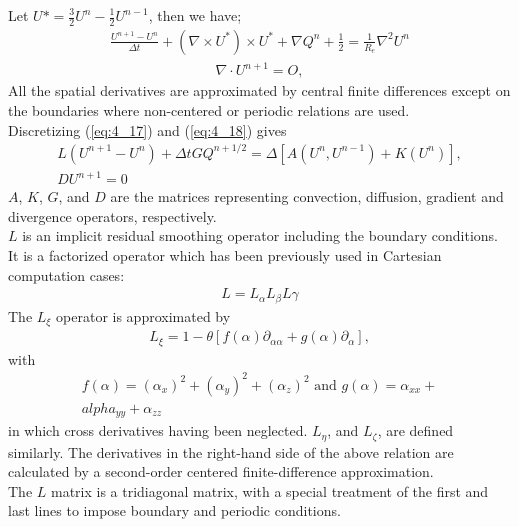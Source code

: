 \documentclass[11pt]{report}
\newcommand{\sps}{\\[0.2cm]}
\newcommand{\refn}[1]{(\ref{#1})}
\newcommand{\refx}[1]{\refn{eq:#1}}
\newcommand{\dsp}{\displaystyle}
\newcommand{\NI}{\noindent}
\begin{document}
	\NI Let $U*=\dsp\frac{3}{2}U^n - \frac{1}{2}U^{n-1}$, then we have;
	\begin{multline}
			\frac{U^{n+1} - U^n}{\Delta t} +\left(\nabla \times U^*\right)\times U^* + \nabla Q^n + \frac{1}{2} = \frac{1}{R_e}\nabla^2 U^{n}\label{eq:4_17}
	\end{multline}
	\begin{eqnarray}
		\nabla \cdot U^{n+1}=O,\label{eq:4_18}
	\end{eqnarray}
	All the spatial derivatives are approximated by central finite differences except on the boundaries where non-centered or periodic relations are used.\\
	Discretizing \refx{4_17} and \refx{4_18} gives
	\begin{gather}
		L(U^{n+1} - U^n) + \Delta t GQ^{n+1/2} = \Delta\left[A(U^n, U^{n-1})+K(U^n)\right],\label{eq:4_19}\sps
		DU^{n+1} = 0
	\end{gather}
	$A$, $K$, $G$, and $D$ are the matrices representing convection, diffusion, gradient and divergence operators, respectively.\\
	$L$ is an implicit residual smoothing operator including the boundary conditions. It is a
	factorized operator which has been previously used in Cartesian computation cases:
	\begin{eqnarray}
		L=L_\alpha L_\beta L\gamma
	\end{eqnarray}
	The $L_\xi$ operator is approximated by
	\begin{eqnarray*}
		L_\xi = 1-\theta[f(\alpha)\partial_{\alpha\alpha}+g(\alpha)\partial_\alpha],
	\end{eqnarray*}
	with
	\begin{eqnarray*}
		f(\alpha) = (\alpha_x)^2 + (\alpha_y)^2 + (\alpha_z)^2 \text{ and } g(\alpha) = \alpha_{xx} + \\alpha_{yy} + \alpha_{zz}
	\end{eqnarray*}
	in which cross derivatives having been neglected. $L_\eta$, and $L_\zeta$, are defined similarly. The derivatives in the right-hand side of the above relation are calculated by a second-order centered finite-difference approximation.\\
	
	\NI The $L$ matrix is a tridiagonal matrix, with a special treatment of the first and last lines to impose boundary and periodic conditions.\\
	
\end{document}

